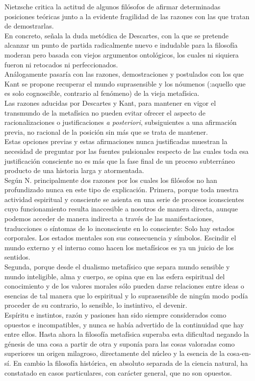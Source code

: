 \documentclass[a4paper, 10pt, twocolumn, spanish]{article}
\begin{document}
Nietzsche critica la actitud de algunos filósofos de afirmar
determinadas posiciones teóricas junto a la evidente fragilidad de las
razones con las que tratan de demostrarlas.\\[0pt]
En concreto, señala la duda metódica de Descartes, con la que se
pretende alcanzar un punto de partida radicalmente nuevo e indudable
para la filosofía moderan pero basada con viejos argumentos
ontológicos, los cuales ni siquiera fueron ni retocados ni
perfeccionados.\\[0pt]
Análogamente pasaría con las razones, demostraciones y postulados con
los que Kant se propone recuperar el mundo suprasensible y los
nóumenos (:aquello que es solo cognoscible, contrario al fenómeno) de
la vieja metafísica.\\[0pt]
Las razones aducidas por Descartes y Kant, para mantener en vigor el
transmundo de la metafísica no pueden evitar ofrecer el aspecto de
racionalizaciones o justificaciones \emph{a posteriori}, subsiguientes a
una afirmación previa, no racional de la posición sin más que se
trata de mantener.\\[0pt]

Estas opciones previas y estas afirmaciones nunca justificadas
muestran la necesidad de preguntar por las fuentes pulsionales
respecto de las cuales toda esa justificación consciente no es más que
la fase final de un proceso subterráneo producto de una historia larga
y atormentada.\\[0pt]
Según N. principalmente dos razones por los cuales los filósofos no
han profundizado nunca en este tipo de explicación. Primera, porque
toda nuestra actividad espiritual y consciente se asienta en una serie
de procesos iconscientes cuyo funcionamiento resulta inaccesible a
nosotros de manera directa, aunque podemos acceder de manera indirecta
a través de las manifestaciones, traducciones o síntomas de lo
inconsciente en lo consciente: Solo hay estados corporales. Los
estados mentales son sus consecuencia y símbolos. Escindir el mundo
externo y el interno como hacen los metafísicos es ya un juicio de los
sentidos.\\[0pt]

Segunda, porque desde el dualismo metafísico que separa mundo sensible
y mundo inteligible, alma y cuerpo, se opina que en las esfera
espiritual del conocimiento y de los valores morales sólo pueden darse
relaciones entre ideas o esencias de tal manera que lo espiritual y lo
suprasensible de ningún modo podía proceder de su contrario, lo
sensible, lo instintivo, el devenir.\\[0pt]
Espíritu e instintos, razón y pasiones han sido siempre considerados
como opuestos e incompatibles, y nunca se había advertido de la
continuidad que hay entre ellos. Hasta ahora la filosofía metafísica
superaba esta dificultad negando la génesis de una cosa a partir de
otra y suponía para las cosas valoradas como superiores un origen
milagroso, directamente del núcleo y la esencia de la cosa-en-sí. En
cambio la filosofía histórica, en absoluto separada de la ciencia
natural, ha constatado en casos particulares, con carácter general,
que no son opuestos.\\[0pt]
\end{document}
